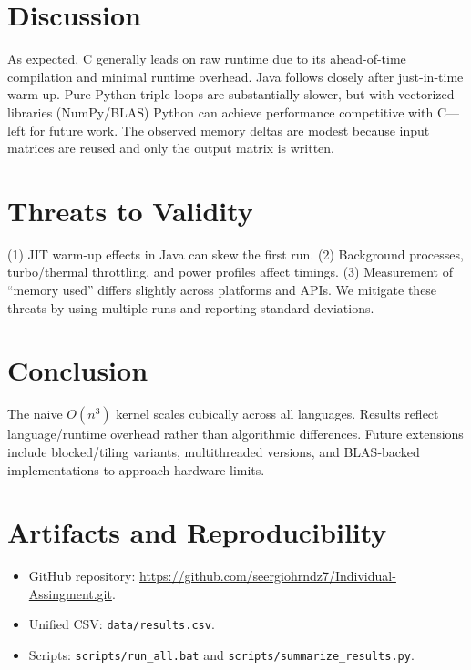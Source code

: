 \documentclass[11pt,a4paper]{article}
\begin{document}
\section{Discussion}
As expected, C generally leads on raw runtime due to its ahead-of-time compilation and minimal runtime overhead. Java follows closely after just-in-time warm-up. Pure-Python triple loops are substantially slower, but with vectorized libraries (NumPy/BLAS) Python can achieve performance competitive with C---left for future work. The observed memory deltas are modest because input matrices are reused and only the output matrix is written.

\section{Threats to Validity}
(1) JIT warm-up effects in Java can skew the first run. (2) Background processes, turbo/thermal throttling, and power profiles affect timings. (3) Measurement of ``memory used'' differs slightly across platforms and APIs. We mitigate these threats by using multiple runs and reporting standard deviations.

\section{Conclusion}
The naive $O(n^3)$ kernel scales cubically across all languages. Results reflect language/runtime overhead rather than algorithmic differences. Future extensions include blocked/tiling variants, multithreaded versions, and BLAS-backed implementations to approach hardware limits.

\section*{Artifacts and Reproducibility}
\begin{itemize}
  \item GitHub repository: \url{https://github.com/seergiohrndz7/Individual-Assingment.git}.
  \item Unified CSV: \texttt{data/results.csv}.
  \item Scripts: \texttt{scripts/run\_all.bat} and \texttt{scripts/summarize\_results.py}.
\end{itemize}



\end{document}

